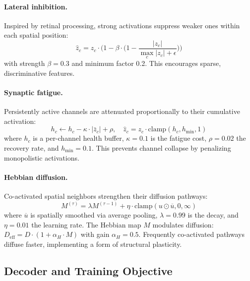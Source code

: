 \documentclass{article}
\begin{document}
\paragraph{Lateral inhibition.} Inspired by retinal processing, strong activations suppress weaker ones within each spatial position:
\begin{equation}
    \hat{z}_c = z_c \cdot \Big(1 - \beta \cdot \big(1 - \frac{|z_c|}{\max_c |z_c| + \epsilon}\big)\Big)
    \label{eq:inhibition}
\end{equation}
with strength $\beta = 0.3$ and minimum factor 0.2. This encourages sparse, discriminative features.

\paragraph{Synaptic fatigue.} Persistently active channels are attenuated proportionally to their cumulative activation:
\begin{equation}
    h_c \leftarrow h_c - \kappa \cdot |\bar{z}_c| + \rho, \quad \hat{z}_c = z_c \cdot \text{clamp}(h_c, h_{\min}, 1)
    \label{eq:fatigue}
\end{equation}
where $h_c$ is a per-channel health buffer, $\kappa = 0.1$ is the fatigue cost, $\rho = 0.02$ the recovery rate, and $h_{\min} = 0.1$. This prevents channel collapse by penalizing monopolistic activations.

\paragraph{Hebbian diffusion.} Co-activated spatial neighbors strengthen their diffusion pathways:
\begin{equation}
    M^{(\tau)} = \lambda M^{(\tau-1)} + \eta \cdot \text{clamp}(u \odot \overline{u}, 0, \infty)
    \label{eq:hebbian}
\end{equation}
where $\overline{u}$ is spatially smoothed via average pooling, $\lambda = 0.99$ is the decay, and $\eta = 0.01$ the learning rate. The Hebbian map $M$ modulates diffusion: $D_{\text{eff}} = D \cdot (1 + \alpha_H \cdot M)$ with gain $\alpha_H = 0.5$. Frequently co-activated pathways diffuse faster, implementing a form of structural plasticity.

\subsection{Decoder and Training Objective}
\label{sec:training}
\end{document}

